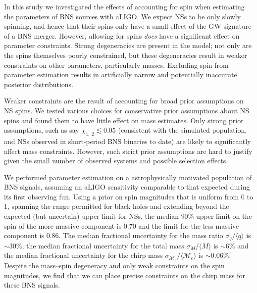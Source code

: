 In this study we investigated the effects of accounting for spin when estimating the parameters of BNS sources with aLIGO. We expect NSs to be only slowly spinning, and hence that their spins only have a small effect of the GW signature of a BNS merger. However, allowing for spins \emph{does} have a significant effect on parameter constraints. Strong degeneracies are present in the model; not only are the spins themselves poorly constrained, but these degeneracies result in weaker constraints on other parameters, particularly masses.  Excluding spin from parameter estimation results in artificially narrow and potentially inaccurate posterior distributions.

Weaker constraints are the result of accounting for broad prior assumptions on NS spins.  We tested various choices for conservative prior assumptions about NS spins and found them to have little effect on mass estimates.  Only strong prior assumptions, such as say $\chi_{1,~2}\lesssim 0.05$ (consistent with the simulated population, and NSs observed in short-period BNS binaries to date) are likely to significantly affect mass constraints.  However, such strict prior assumptions are hard to justify given the small number of observed systems and possible selection effects.

We performed parameter estimation on a astrophysically motivated population of BNS signals, assuming an aLIGO sensitivity comparable to that expected during its first observing fun. Using a prior on spin magnitudes that is uniform from $0$ to $1$, spanning the range permitted for black holes and extending beyond the expected (but uncertain) upper limit for NSs, the median $90\%$ upper limit on the spin of the more massive component is $0.70$ and the limit for the less massive component is $0.86$. The median fractional uncertainty for the mass ratio $\sigma_q/\langle q \rangle$ is $\sim30\%$, the median fractional uncertainty for the total mass $\sigma_{{M}}/\langle {M} \rangle$ is $\sim6\%$ and the median fractional uncertainty for the chirp mass $\sigma_{\mathcal{M}_\mathrm{c}}/\langle {\mathcal{M}_\mathrm{c}} \rangle$ is $\sim0.06\%$. Despite the mass--spin degeneracy and only weak constraints on the spin magnitudes, we find that we can place precise constraints on the chirp mass for these BNS signals.

